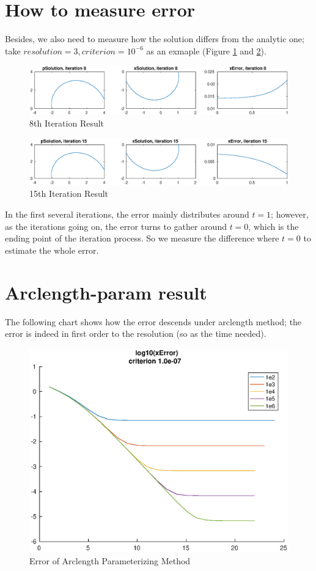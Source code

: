 \documentclass[a4paper]{article}
\begin{document}
\section{How to measure error}
Besides, we also need to measure how the solution differs from the analytic one; take $resolution=3, criterion=10^{-6}$ as an exmaple (Figure \ref{fig:p1-arclength-i8} and \ref{fig:p1-arclength-i15}).
\begin{figure}[h]
	\centering
	\includegraphics[width=\textwidth]{part1-arclength-iteration8}
	\caption{8th Iteration Result}
	\label{fig:p1-arclength-i8}
\end{figure}
\begin{figure}[h]
	\centering
	\includegraphics[width=\textwidth]{part1-arclength-iteration15}
	\caption{15th Iteration Result}
	\label{fig:p1-arclength-i15}
\end{figure}
In the first several iterations, the error mainly distributes around $t=1$; however, as the iterations going on, the error turns to gather around $t=0$, which is the ending point of the iteration process.
So we measure the difference where $t=0$ to estimate the whole error.
\section{Arclength-param result}
The following chart shows how the error descends under arclength method; the error is indeed in first order to the resolution (so as the time needed).
\begin{figure}[h]
	\centering
	\includegraphics[width=\textwidth]{part1-arclength-resolution-error}
	\caption{Error of Arclength Parameterizing Method}
	\label{fig:p1-arclength-error}
\end{figure}
\end{document}
